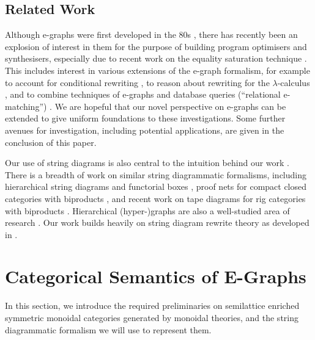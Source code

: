 \subsection{Related Work}

Although e-graphs were first developed in the 80s \cite{nelson1980techniques}, there has recently been an explosion of interest in them for the purpose of building program optimisers and synthesisers, especially due to recent work on the equality saturation technique \cite{10.1145/1594834.1480915, griggio_proceedings_2022, EggPaper,flatt_small_2022}.  This includes interest in various extensions of the e-graph formalism, for example to account for conditional rewriting \cite{singher2023colored},  to reason about rewriting for the $\lambda$-calculus \cite{koehler2022sketchguided},  and to combine techniques of e-graphs and database queries (``relational e-matching'') \cite{zhang_relational_2022}.  We are hopeful that our novel perspective on e-graphs can be extended to give uniform foundations to these investigations.  Some further avenues for investigation, including potential applications, are given in the conclusion of this paper. 

Our use of string diagrams is also central to the intuition behind our work \cite{Selinger_2010, joyal_geometry_1991}.  There is a breadth of work on similar string diagrammatic formalisms,  including hierarchical string diagrams \cite{ghica-zanassi2023string} and functorial boxes \cite{mellies_functorial_2006},  proof nets for compact closed categories with biproducts \cite{duncan_generalised_2009}, and recent work on tape diagrams for rig categories with biproducts \cite{bonchi_tape_nodate}. 
Hierarchical (hyper-)graphs are also a well-studied area of research \cite{plump:hierarchical-graphs, montanari:gs-lambda, palacz:hierarchical-transform, Gaducci:hierarchical-graphs, Ghica:hierarchical}. 
Our work builds heavily on string diagram rewrite theory as developed in \cite{bonchi_string_2022,bonchi_string_2022-1, bonchi_string_2022-2}. 

\section{Categorical Semantics of E-Graphs}
In this section,  we introduce the required preliminaries on semilattice enriched symmetric monoidal categories generated by monoidal theories,  and the string diagrammatic formalism we will use to represent them.  

